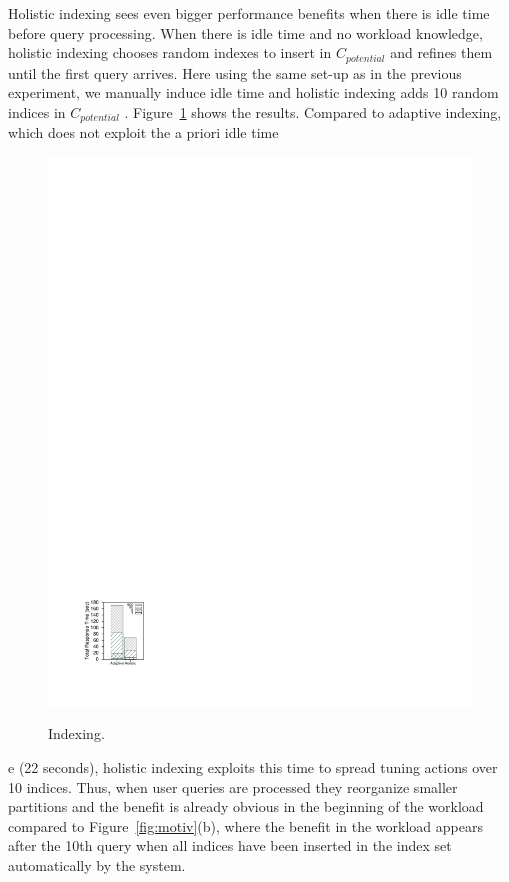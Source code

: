 Holistic indexing sees even bigger performance benefits when there is idle time before query processing.
When there is idle time and no workload knowledge, holistic indexing chooses random indexes to insert in $C_{potential}$  and refines them until the first query arrives. Here using the same set-up as in the previous experiment, we manually induce idle time and holistic indexing adds 10 random indices in $C_{potential}$ .
Figure~\ref{fig:apriori} shows the results.
Compared to adaptive indexing, which does not exploit the a priori idle time
\begin{figure}
\begin{center}
\includegraphics[trim=2.8cm 1.8cm 18cm 23cm]{Figures/holistic/hist_motivation_apriori}
\vspace{-0.2in}
\caption{Indexing.}
\vspace{-0.7cm}
\label{fig:apriori}
\end{center}
\end{figure}
e (22 seconds), holistic indexing exploits 
this time to spread tuning actions over 10 indices.
Thus, when user queries are processed they reorganize smaller partitions and the benefit is already obvious in the beginning of the workload compared to Figure~\ref{fig:motiv}(b), where the benefit in the workload appears after the 10th query when all indices have been inserted in the index set automatically by the system.


